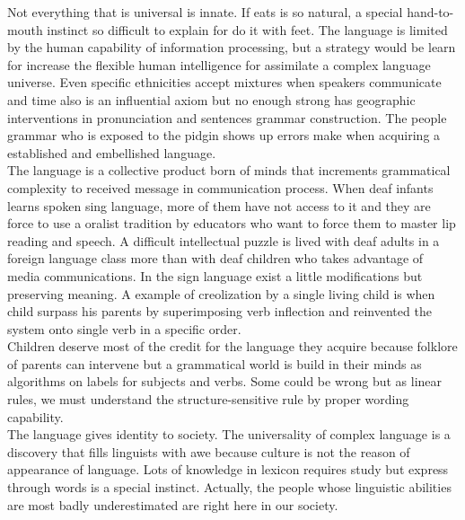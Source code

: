 \documentclass[13pt,letterpaper,onecolumn]{report}
\begin{document}
\hspace{1em} Not everything that is universal is innate. If eats is so natural, a special hand-to-mouth instinct so difficult to explain for do it with feet. The language is limited by the human capability of information processing, but a strategy would be learn for increase the flexible human intelligence for assimilate a complex language universe. Even specific ethnicities accept mixtures when speakers communicate and time also is an influential axiom but no enough strong has geographic interventions in pronunciation and sentences grammar construction. The people grammar who is exposed to the pidgin shows up errors make when acquiring a established and embellished language.\\
\hspace{1em}The language is a collective product born of minds that increments grammatical complexity to received message in communication process. When deaf infants learns spoken sing language, more of them have not access to it and they are force to use a oralist tradition by educators who want to force them to master lip reading and speech. A difficult intellectual puzzle is lived with deaf adults in a foreign language class more than with deaf children who takes advantage of media communications. In the sign  language exist a little modifications but preserving meaning. A example of creolization by a single living child is when  child surpass his parents by superimposing verb inflection and reinvented the system onto single verb in a specific order.\\
\hspace{1em} Children deserve most of the credit for the language they acquire because folklore of parents can intervene but a grammatical world is build in their minds as algorithms on labels for subjects and verbs. Some could be wrong but as linear rules, we must understand the structure-sensitive rule by proper wording capability.\\
                   
\hspace{1em} The language gives identity to society. The universality of complex language is a discovery that fills linguists with awe because culture is not the reason of appearance of language. Lots of knowledge in lexicon requires study but express through words is a special instinct. Actually, the people whose linguistic abilities are most badly underestimated are right here in our society.\\
\end{document}

